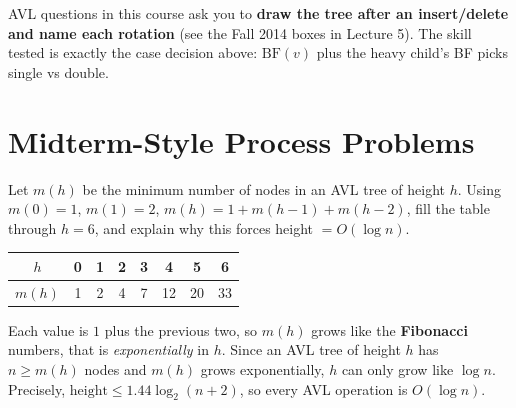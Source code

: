 \documentclass[11pt]{article}
\begin{document}
\begin{warnbox}
AVL questions in this course ask you to \textbf{draw the tree after an insert/delete and name each rotation} (see the Fall 2014 boxes in Lecture 5). The skill tested is exactly the case decision above: $\text{BF}(v)$ plus the heavy child's BF picks single vs double.
\end{warnbox}

\section{Midterm-Style Process Problems}

\begin{examplebox}
Let $m(h)$ be the minimum number of nodes in an AVL tree of height $h$. Using $m(0)=1$, $m(1)=2$, $m(h)=1+m(h-1)+m(h-2)$, fill the table through $h=6$, and explain why this forces height $=O(\log n)$.

\begin{answerband}
\renewcommand{\arraystretch}{1.25}
\begin{center}
\begin{tabular}{c|c c c c c c c}
$h$ & 0 & 1 & 2 & 3 & 4 & 5 & 6\\
\hline
$m(h)$ & 1 & 2 & 4 & 7 & 12 & 20 & 33\\
\end{tabular}
\end{center}
Each value is $1$ plus the previous two, so $m(h)$ grows like the \textbf{Fibonacci} numbers, that is \emph{exponentially} in $h$. Since an AVL tree of height $h$ has $n\geq m(h)$ nodes and $m(h)$ grows exponentially, $h$ can only grow like $\log n$. Precisely, $\text{height}\leq 1.44\log_2(n+2)$, so every AVL operation is \textcolor{violetT}{$O(\log n)$}.
\end{answerband}
\end{examplebox}
\end{document}
